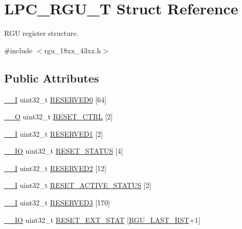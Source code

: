 \hypertarget{struct_l_p_c___r_g_u___t}{}\section{L\+P\+C\+\_\+\+R\+G\+U\+\_\+T Struct Reference}
\label{struct_l_p_c___r_g_u___t}


R\+GU register structure.  




{\ttfamily \#include $<$rgu\+\_\+18xx\+\_\+43xx.\+h$>$}

\subsection*{Public Attributes}
\begin{DoxyCompactItemize}
\item 
\hyperlink{core__sc300_8h_af63697ed9952cc71e1225efe205f6cd3}{\+\_\+\+\_\+I} uint32\+\_\+t \hyperlink{struct_l_p_c___r_g_u___t_a1b4b0c64ae33729b8ec1d1d79ba373d4}{R\+E\+S\+E\+R\+V\+E\+D0} \mbox{[}64\mbox{]}
\item 
\hyperlink{core__sc300_8h_a7e25d9380f9ef903923964322e71f2f6}{\+\_\+\+\_\+O} uint32\+\_\+t \hyperlink{struct_l_p_c___r_g_u___t_a34d7a7663b7c59545f7462ee36563162}{R\+E\+S\+E\+T\+\_\+\+C\+T\+RL} \mbox{[}2\mbox{]}
\item 
\hyperlink{core__sc300_8h_af63697ed9952cc71e1225efe205f6cd3}{\+\_\+\+\_\+I} uint32\+\_\+t \hyperlink{struct_l_p_c___r_g_u___t_aba129ebadcbd52f7f25fca1eda91365c}{R\+E\+S\+E\+R\+V\+E\+D1} \mbox{[}2\mbox{]}
\item 
\hyperlink{core__sc300_8h_aec43007d9998a0a0e01faede4133d6be}{\+\_\+\+\_\+\+IO} uint32\+\_\+t \hyperlink{struct_l_p_c___r_g_u___t_a517f46ae39180b73632601f1718090a3}{R\+E\+S\+E\+T\+\_\+\+S\+T\+A\+T\+US} \mbox{[}4\mbox{]}
\item 
\hyperlink{core__sc300_8h_af63697ed9952cc71e1225efe205f6cd3}{\+\_\+\+\_\+I} uint32\+\_\+t \hyperlink{struct_l_p_c___r_g_u___t_a5249d37d3e4e723240e6366f3c3deea4}{R\+E\+S\+E\+R\+V\+E\+D2} \mbox{[}12\mbox{]}
\item 
\hyperlink{core__sc300_8h_af63697ed9952cc71e1225efe205f6cd3}{\+\_\+\+\_\+I} uint32\+\_\+t \hyperlink{struct_l_p_c___r_g_u___t_a3a8cfe2b5a67630542499d0e61d40e76}{R\+E\+S\+E\+T\+\_\+\+A\+C\+T\+I\+V\+E\+\_\+\+S\+T\+A\+T\+US} \mbox{[}2\mbox{]}
\item 
\hyperlink{core__sc300_8h_af63697ed9952cc71e1225efe205f6cd3}{\+\_\+\+\_\+I} uint32\+\_\+t \hyperlink{struct_l_p_c___r_g_u___t_a94a529e76fceb3a235769ae5422fbf91}{R\+E\+S\+E\+R\+V\+E\+D3} \mbox{[}170\mbox{]}
\item 
\hyperlink{core__sc300_8h_aec43007d9998a0a0e01faede4133d6be}{\+\_\+\+\_\+\+IO} uint32\+\_\+t \hyperlink{struct_l_p_c___r_g_u___t_aad4fc8bba90e54d2a53e5be86c64fdfc}{R\+E\+S\+E\+T\+\_\+\+E\+X\+T\+\_\+\+S\+T\+AT} \mbox{[}\hyperlink{group___r_g_u__18_x_x__43_x_x_ggaba95b3f477c73ccfad274a65a9c97a9eacf1bcccbc49254edfcb4a3540a7c8b67}{R\+G\+U\+\_\+\+L\+A\+S\+T\+\_\+\+R\+ST}+1\mbox{]}
\end{DoxyCompactItemize}


